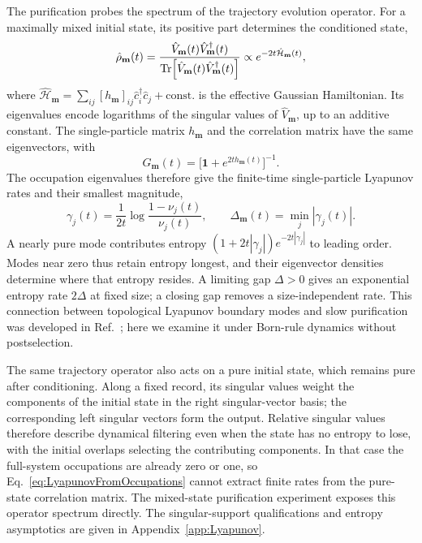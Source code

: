 \documentclass[aps,prb,10pt,twocolumn,superscriptaddress,longbibliography,floatfix]{revtex4-2}
\newcommand{\rec}{\mathbf m}   %
\begin{document}
{The purification probes the spectrum of the trajectory evolution operator. For a maximally mixed initial state, its positive part determines the conditioned state,
\begin{equation}
 \hat\rho_{\rec}(t)=\frac{\hat V_{\rec}(t)\hat V_{\rec}^\dagger(t)}
 {\Tr[\hat V_{\rec}(t)\hat V_{\rec}^\dagger(t)]}
 \propto e^{-2t\hat{\mathcal H}_{\rec}(t)},
 \label{eq:PurificationKrausProduct}
\end{equation}
where $\hat{\mathcal H}_{\rec}=\sum_{ij}[h_{\rec}]_{ij}\hat c_i^\dagger\hat c_j+\mathrm{const.}$ is the effective Gaussian Hamiltonian. Its eigenvalues encode logarithms of the singular values of $\hat V_{\rec}$, up to an additive constant. The single-particle matrix $h_{\rec}$ and the correlation matrix have the same eigenvectors, with
\begin{equation}
 G_{\rec}(t)=\big[\mathbf{1}+e^{2t h_{\rec}(t)}\big]^{-1}.
 \label{eq:PurificationFermiFunction}
\end{equation}
The occupation eigenvalues therefore give the finite-time single-particle Lyapunov rates and their smallest magnitude,
\begin{equation}
 \gamma_j(t)=\frac{1}{2t}\log\frac{1-\nu_j(t)}{\nu_j(t)},\qquad
 \Delta_{\rec}(t)=\min_j|\gamma_j(t)|.
 \label{eq:LyapunovFromOccupations}
\end{equation}
A nearly pure mode contributes entropy $(1+2t|\gamma_j|)e^{-2t|\gamma_j|}$ to leading order. Modes near zero thus retain entropy longest, and their eigenvector densities determine where that entropy resides. A limiting gap $\Delta>0$ gives an exponential entropy rate $2\Delta$ at fixed size; a closing gap removes a size-independent rate. This connection between topological Lyapunov boundary modes and slow purification was developed in Ref.~\cite{XiaoKawabata2026}; here we examine it under Born-rule dynamics without postselection.

The same trajectory operator also acts on a pure initial state, which remains pure after conditioning. Along a fixed record, its singular values weight the components of the initial state in the right singular-vector basis; the corresponding left singular vectors form the output. Relative singular values therefore describe dynamical filtering even when the state has no entropy to lose, with the initial overlaps selecting the contributing components. In that case the full-system occupations are already zero or one, so Eq.~\eqref{eq:LyapunovFromOccupations} cannot extract finite rates from the pure-state correlation matrix. The mixed-state purification experiment exposes this operator spectrum directly. The singular-support qualifications and entropy asymptotics are given in Appendix~\ref{app:Lyapunov}.

}
\end{document}
